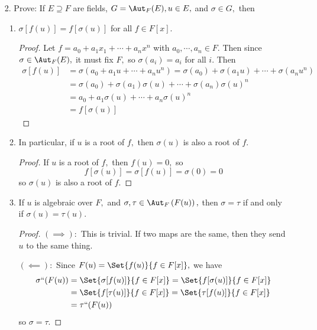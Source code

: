 \documentclass{article}
\begin{document}
\begin{itemize}
	\item[2.] Prove: If $E\supseteq F$ are fields, $G=\Aut_F(E), u\in E,$ and $\sigma\in G,$ then
		\begin{enumerate}[(1)]
			\item $\sigma[f(u)] = f[\sigma(u)]$ for all $f\in F[x].$
				\begin{proof}
					Let $f=a_0+a_1x_1+\cdots+a_n x^n$ with $a_0, \cdots, a_n\in F.$ Then since $\sigma\in \Aut_F(E),$ it must fix $F,$ so $\sigma(a_i)=a_i$ for all $i.$ Then 
					\begin{align*}
						\sigma[f(u)] &= \sigma(a_0+a_1u + \cdots +a_n u^n) = \sigma(a_0) + \sigma(a_1u) + \cdots + \sigma(a_n u^n) \\
						&= \sigma(a_0) + \sigma(a_1)\sigma(u) + \cdots + \sigma(a_n)\sigma(u)^n \\
						&= a_0 + a_1 \sigma(u) + \cdots + a_n \sigma(u)^n \\
						&= f[\sigma(u)]
					\end{align*}
				\end{proof}
				
			\item In particular, if $u$ is a root of $f,$ then $\sigma(u)$ is also a root of $f.$
				\begin{proof}
					If $u$ is a root of $f,$ then $f(u)=0,$ so
					\[f[\sigma(u)] = \sigma[f(u)] = \sigma(0) = 0\]
					so $\sigma(u)$ is also a root of $f.$
				\end{proof}

			\item If $u$ is algebraic over $F,$ and $\sigma, \tau\in \Aut_F\left( F(u) \right),$ then $\sigma=\tau$ if and only if $\sigma(u)=\tau(u).$
				\begin{proof}
					$(\implies):$ This is trivial. If two maps are the same, then they send $u$ to the same thing.

					$(\impliedby):$ Since $F(u)=\Set{f(u)}{f\in F[x]},$ we have
					\begin{align*}
						\sigma``(F(u)) &= \Set{\sigma[f(u)]}{f\in F[x]} = \Set{f[\sigma(u)]}{f\in F[x]} \\
						&= \Set{f[\tau(u)]}{f\in F[x]} = \Set{\tau[f(u)]}{f\in F[x]} \\
						&= \tau``(F(u))
					\end{align*}
					so $\sigma=\tau.$
				\end{proof}
				
		\end{enumerate}


\end{itemize}
\end{document}
